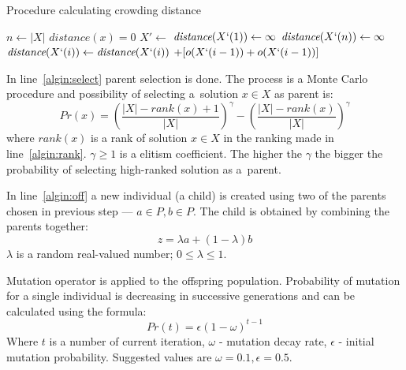 \begin{algorithm}
  \caption{Procedure calculating crowding distance}\label{alg:crowddist}
  \begin{algorithmic}[1]
    \State $n \gets |X|$ 
     
    \State $\textit{distance}(x) = 0$
    \EndFor
    \State $X' \gets$  
    \State $\textit{distance}(X`(1)) \gets \infty$ 
    \State $\textit{distance}(X`(n)) \gets \infty$ 
    \EndFor
     
    \State $\textit{distance}(X`(i)) \gets \textit{distance}(X`(i))$
    $+ [o(X`(i-1)) + o(X`(i-1))]$
    \EndFor
    \EndProcedure{}
  \end{algorithmic}
\end{algorithm}

In line~\ref{algin:select} parent selection is done. The process is a Monte
Carlo procedure and possibility of selecting a~solution $x \in X$ as parent
is:\\
$$Pr(x) = \left( \frac{|X|-\textit{rank}(x) + 1}{|X|} \right)^\gamma - \left( \frac{|X|-\textit{rank}(x)}{|X|} \right)^\gamma$$
where $\textit{rank}(x)$ is a rank of solution $x \in X$ in the ranking made
in line~\ref{algin:rank}. $\gamma \geq 1$ is a elitism coefficient. The higher
the $\gamma$ the bigger the probability of selecting high-ranked solution as
a~parent.

In line~\ref{algin:off} a new individual (a child) is created using two of the
parents chosen in previous step --- $a \in P, b \in P$. The child is obtained
by combining the parents together: $$z = \lambda a + (1 - \lambda) b$$
$\lambda$ is a random real-valued number; $0 \leq \lambda \leq 1$.


Mutation operator is applied to the offspring population. Probability of
mutation for a single individual is decreasing in successive generations and
can be calculated using the formula: $$Pr(t) = \epsilon (1 - \omega)^{t-1}$$
Where $t$ is a number of current iteration, $\omega$ - mutation decay rate,
$\epsilon$ - initial mutation probability. Suggested values are
$\omega = 0.1, \epsilon = 0.5$.
